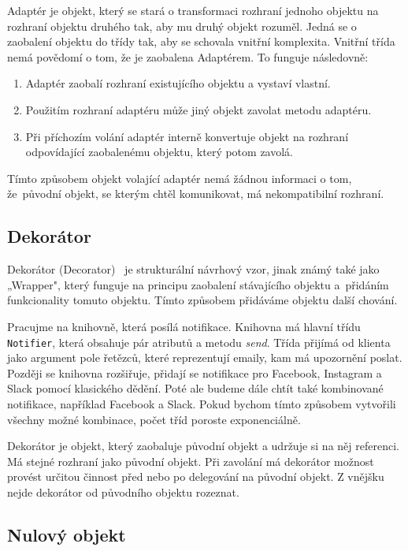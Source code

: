 Adaptér je objekt, který se stará o transformaci rozhraní jednoho objektu na rozhraní objektu druhého tak, aby mu druhý objekt rozuměl. Jedná se o zaobalení objektu do třídy tak, aby se schovala vnitřní komplexita. Vnitřní třída nemá povědomí o tom, že je zaobalena Adaptérem. To funguje následovně:

\begin{enumerate}
    \item Adaptér zaobalí rozhraní existujícího objektu a vystaví vlastní.
    \item Použitím rozhraní adaptéru může jiný objekt zavolat metodu adaptéru.
    \item Při příchozím volání adaptér interně konvertuje objekt na rozhraní odpovídající zaobalenému objektu, který potom zavolá.
\end{enumerate}

Tímto způsobem objekt volající adaptér nemá žádnou informaci o tom, že~původní objekt, se kterým chtěl komunikovat, má nekompatibilní rozhraní.

\subsection{Dekorátor}

Dekorátor (Decorator)~\cite{Decorator} je strukturální návrhový vzor, jinak známý také jako „Wrapper", který funguje na principu zaobalení stávajícího objektu a~přidáním funkcionality tomuto objektu. Tímto způsobem přidáváme objektu další chování.

Pracujme na knihovně, která posílá notifikace. Knihovna má hlavní třídu \texttt{Notifier}, která obsahuje pár atributů a metodu \textit{send}. Třída přijímá od klienta jako argument pole řetězců, které reprezentují emaily, kam má upozornění poslat. Později se knihovna rozšiřuje, přidají se notifikace pro Facebook, Instagram a Slack pomocí klasického dědění. Poté ale budeme dále chtít také kombinované notifikace, například Facebook a Slack. Pokud bychom tímto způsobem vytvořili všechny možné kombinace, počet tříd poroste exponenciálně.

Dekorátor je objekt, který zaobaluje původní objekt a udržuje si na něj referenci. Má stejné rozhraní jako původní objekt. Při zavolání má dekorátor možnost provést určitou činnost před nebo po delegování na původní objekt. Z vnějšku nejde dekorátor od původního objektu rozeznat.

\subsection{Nulový objekt}
\label{null object}

